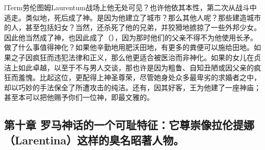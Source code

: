 lTerm{劳伦图姆}{Laurentum}战场上他无处可见？也许他依其本性，第二次从战斗中逃走。类似地，死后成了神。是因为他建立了城市？那么其他人呢？那些建造城市的人，甚至包括妇女？当然，还杀死了他的兄弟，并狡猾地掳掠了一些外邦少女。因此他当然成了神，也因此成了（），因为那时他们的父亲不得不为他使用长矛。做了什么事值得神化？如果他辛勤地用肥沃田地，有更多的粪便可以施给田地。如果之子因疯狂而违犯法律和正义，那么他更适合被医治而非神化。如果的女儿在贞洁上如此卓越，以至于不与男人交谈，那也许是因为粗鲁、自知丑陋或因父亲的疯狂而羞愧。比起这位，更配得上神圣尊荣，尽管她身处众多最卑劣的求婚者之中，却以巧妙的手法保全了所遭攻击的纯洁。还有，因其好客，王为他建了一座神庙；甚至本可以把他赐予你们一位神，即最文雅的。\par


\subsection{第十章 罗马神话的一个可耻特征：它尊崇像拉伦提娜（Larentina）这样的臭名昭著人物。}

